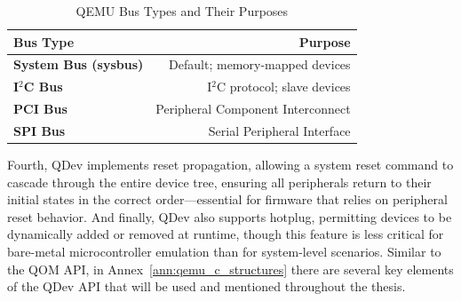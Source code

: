\begin{table}[H]
    \centering
    
    \begin{tabular}{l r}
        \toprule
        \textbf{Bus Type} & \textbf{Purpose} \\
        \midrule
        \textbf{System Bus (sysbus)} & Default; memory-mapped devices \\
        \textbf{I$^2$C Bus} & I$^2$C protocol; slave devices \\
        \textbf{PCI Bus} & Peripheral Component Interconnect \\
        \textbf{SPI Bus} & Serial Peripheral Interface \\
    \bottomrule
    \end{tabular}
    \caption{QEMU Bus Types and Their Purposes}
    \label{tab:qemu_bus_types}
\end{table}



Fourth, QDev implements reset propagation, allowing a system reset command 
to cascade through the entire device tree, ensuring all peripherals return to their 
initial states in the correct order—essential for firmware that relies on peripheral 
reset behavior. And finally, QDev also supports hotplug, permitting devices to be 
dynamically added or removed at runtime, though this feature is less critical for 
bare-metal microcontroller emulation than for system-level scenarios. Similar to the QOM API, in Annex~\ref{ann:qemu_c_structures} there are several key elements of the QDev API that 
will be used and mentioned throughout the thesis.